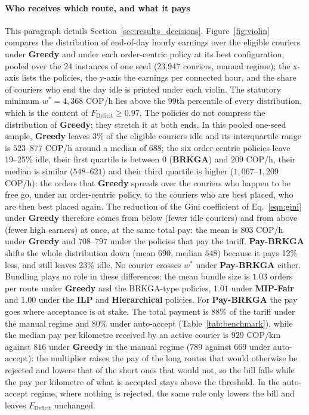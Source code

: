\documentclass[a4paper,11pt,review,3p,authoryear]{elsarticle}
\newcommand{\FD}{F_{\text{Deficit}}}
\begin{document}
\paragraph{Who receives which route, and what it pays} This paragraph details Section~\ref{sec:results_decisions}. Figure~\ref{fig:violin} compares the distribution of end-of-day hourly earnings over the eligible couriers under \textbf{Greedy} and under each order-centric policy at its best configuration, pooled over the 24 instances of one seed (23{,}947 couriers, manual regime); the x-axis lists the policies, the y-axis the earnings per connected hour, and the share of couriers who end the day idle is printed under each violin. The statutory minimum $w^* = 4{,}368$ COP/h lies above the 99th percentile of every distribution, which is the content of $\FD \ge 0.97$. The policies do not compress the distribution of \textbf{Greedy}; they stretch it at both ends. In this pooled one-seed sample, \textbf{Greedy} leaves 3\% of the eligible couriers idle and its interquartile range is $523$--$877$ COP/h around a median of $688$; the six order-centric policies leave 19--25\% idle, their first quartile is between $0$ (\textbf{BRKGA}) and $209$ COP/h, their median is similar ($548$--$621$) and their third quartile is higher ($1{,}067$--$1{,}209$ COP/h): the orders that \textbf{Greedy} spreads over the couriers who happen to be free go, under an order-centric policy, to the couriers who are best placed, who are then best placed again. The reduction of the Gini coefficient of Eq.~\eqref{eqn:gini} under \textbf{Greedy} therefore comes from below (fewer idle couriers) and from above (fewer high earners) at once, at the same total pay: the mean is $803$ COP/h under \textbf{Greedy} and $708$--$797$ under the policies that pay the tariff. \textbf{Pay-BRKGA} shifts the whole distribution down (mean $690$, median $548$) because it pays 12\% less, and still leaves 23\% idle. No courier crosses $w^*$ under \textbf{Pay-BRKGA} either. Bundling plays no role in these differences: the mean bundle size is $1.03$ orders per route under \textbf{Greedy} and the BRKGA-type policies, $1.01$ under \textbf{MIP-Fair} and $1.00$ under the \textbf{ILP} and \textbf{Hierarchical} policies. For \textbf{Pay-BRKGA} the pay goes where acceptance is at stake. The total payment is 88\% of the tariff under the manual regime and 80\% under auto-accept (Table~\ref{tab:benchmark}), while the median pay per kilometre received by an active courier is $929$ COP/km against $816$ under \textbf{Greedy} in the manual regime ($789$ against $669$ under auto-accept): the multiplier raises the pay of the long routes that would otherwise be rejected and lowers that of the short ones that would not, so the bill falls while the pay per kilometre of what is accepted stays above the threshold. In the auto-accept regime, where nothing is rejected, the same rule only lowers the bill and leaves $\FD$ unchanged.
\end{document}
